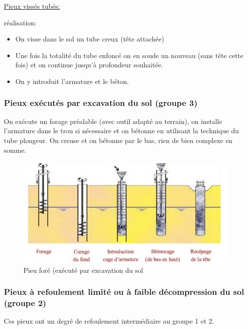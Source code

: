         \underline{Pieux vissés tubés:} 
        
        réalisation: 
        \begin{itemize}
            \item On visse dans le sol un tube creux (tête attachée)
            \item Une fois la totalité du tube enfoncé on en soude un nouveau (sans tête cette fois) et on continue jusqu'à profondeur souhaitée.
            \item On y introduit l'armature et le béton.
        \end{itemize} 
        
        \subsubsection{Pieux exécutés par excavation du sol (groupe 3)}
        
        On exécute un forage préalable (avec outil adapté au terrain), on installe l'armature dans le trou si nécessaire et on bétonne en utilisant la technique du tube plongeur. On creuse et on bétonne par le bas, rien de bien complexe en somme. 
        
        \begin{figure}
            \centering
            \includegraphics{Holeyman/images/H35.PNG}
            \caption{Pieu foré (exécuté par excavation du sol}
        \end{figure}
        
        \subsubsection{Pieux à refoulement limité ou à faible décompression du sol (groupe 2)}
        
        Ces pieux ont un degré de refoulement intermédiaire au groupe 1 et 2. 
        
